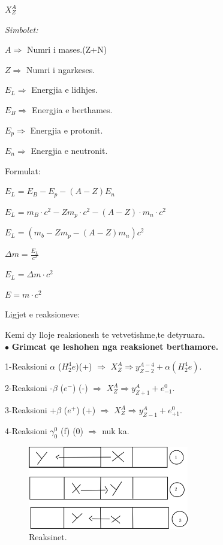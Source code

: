 \documentclass[twocolumn]{article}
\begin{document}
$X^A_Z$

\begin{center}
	\textit{Simbolet:}
\end{center}

$A \Rightarrow $ Numri i mases.(Z+N)

$Z \Rightarrow$ Numri i ngarkeses.

$E_L \Rightarrow$ Energjia e lidhjes.

$E_B \Rightarrow$ Energjia e berthames.

$E_p \Rightarrow$ Energjia e protonit.

$E_n \Rightarrow$  Energjia e neutronit.


\begin{center}
	Formulat:
\end{center}

$E_L =E_B - E_p - (A-Z)E_n$

$E_L = m_B \cdot c^2 - Z m_p \cdot c^2 - (A-Z) \cdot m_n \cdot c^2$

$E_L= (m_b - Zm_p-(A-Z)m_n) c^2$

$\Delta m = \frac{E_L}{c^2} $

$E_L=\Delta m \cdot c^2$

$E=m \cdot c^2$

\begin{center}
	Ligjet e reaksioneve:
\end{center}

Kemi dy lloje reaksionesh te vetvetishme,te detyruara.\\

$\bullet$ \textbf{Grimcat qe leshohen nga reaksionet berthamore.}

1-Reaksioni $\alpha$ ($H^4_2e$)(+) $\Rightarrow$ $X^A_Z \Rightarrow y^{A-4}_{Z-2} + \alpha (H^4_2e)$.

2-Reaksioni -$\beta$ ($e^{-}$) (-) $\Rightarrow$ $X^A_Z \Rightarrow y^A_{Z+1} + e^0_{-1}$.

3-Reaksioni +$\beta$ ($e^{+}$) (+) $\Rightarrow$ $X^A_Z \Rightarrow y^A_{Z-1} + e^0_{+1}$.

4-Reaksioni $\gamma ^0_0$ (f) (0) $\Rightarrow$ nuk ka.\\

\begin{figure}[h]
	\includegraphics[width=70mm]{Imazhet/reaksionet_.png}
	\caption{Reaksinet.}
	\label{fig:boat1}
\end{figure}
\end{document}
